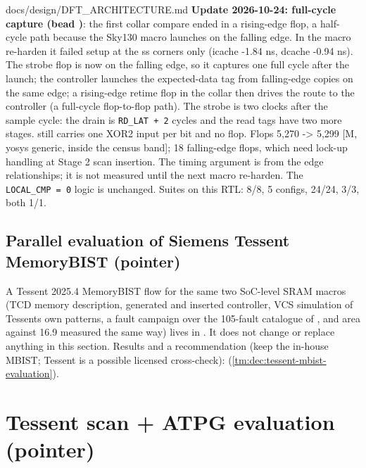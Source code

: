 \begin{relocated}{docs/design/DFT_ARCHITECTURE.md}
\textbf{Update 2026-10-24: full-cycle capture (bead )}: the
first collar compare ended in a rising-edge flop, a half-cycle path
because the Sky130 macro launches  on the falling edge. In
the macro re-harden it failed setup at the ss corners only (icache -1.84
ns, dcache -0.94 ns). The strobe flop is now on the falling edge, so it
captures one full cycle after the launch; the controller launches the
expected-data tag from falling-edge copies on the same edge; a
rising-edge retime flop in the collar then drives the route to the
controller (a full-cycle flop-to-flop path). The strobe is two clocks
after the sample cycle: the drain is
\texttt{RD\_\allowbreak{}LAT\ +\allowbreak{}\ 2} cycles and the read
tags have two more stages.  still carries one XOR2 input per
bit and no flop. Flops 5,270 -\textgreater{} 5,299 {[}M, yosys generic,
inside the census band{]}; 18 falling-edge flops, which need lock-up
handling at Stage 2 scan insertion. The timing argument is from the edge
relationships; it is not measured until the next macro re-harden. The
\texttt{LOCAL\_\allowbreak{}CMP\ =\allowbreak{}\ 0} logic is unchanged.
Suites on this RTL:  8/8,  5
configs,  24/24,  3/3, both
 1/1.

\subsection{Parallel evaluation of Siemens Tessent MemoryBIST
(pointer)}\label{tm:ch:dft-architecture:1613-parallel-evaluation-of-siemens-tessent-memorybist-pointer}

A Tessent 2025.4 MemoryBIST flow for the same two SoC-level SRAM macros
(TCD memory description, generated and inserted controller, VCS
simulation of Tessent\textquotesingle s own patterns, a fault campaign
over the 105-fault catalogue of , and area against
16.9 measured the same way) lives in . It does
not change or replace anything in this section. Results and a
recommendation (keep the in-house MBIST; Tessent is a possible licensed
cross-check):  (\cref{tm:dec:tessent-mbist-evaluation}).

\section{Tessent scan + ATPG evaluation (pointer)}\label{tm:ch:dft-architecture:17-tessent-scan-atpg-evaluation-pointer}


\end{relocated}
